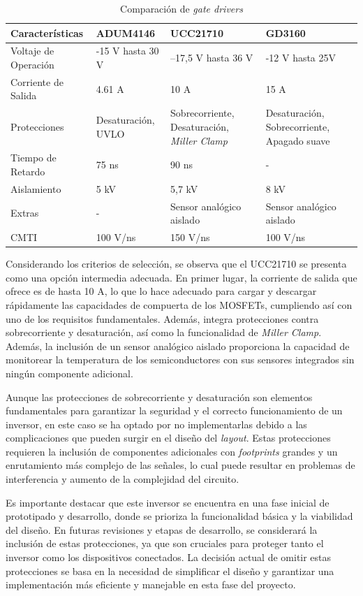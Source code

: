 \begin{table}[H]
	\centering
	\begin{tabular}{|l|p{3.5cm}|p{3.5cm}|p{3.5cm}|}
		\hline
		\textbf{Características} & \textbf{ADUM4146} & \textbf{UCC21710} & \textbf{GD3160} \\
		\hline
		Voltaje de Operación & -15 V hasta 30 V & –17,5 V hasta 36 V & -12 V hasta 25V \\
		\hline
		Corriente de Salida & 4.61 A & 10 A & 15 A \\
		\hline
		Protecciones & Desaturación, UVLO & Sobrecorriente, Desaturación, \textit{Miller Clamp} & Desaturación, Sobrecorriente, Apagado suave \\
		\hline
		Tiempo de Retardo & 75 ns & 90 ns & - \\
		\hline
		Aislamiento & 5 kV & 5,7 kV & 8 kV \\
		\hline
		Extras & - & Sensor analógico aislado & Sensor analógico aislado \\
		\hline
		CMTI & 100 V/ns & 150 V/ns & 100 V/ns \\
		\hline
	\end{tabular}
	\caption{Comparación de \textit{gate drivers}}
\end{table}

Considerando los criterios de selección, se observa que el UCC21710 se presenta como una opción intermedia adecuada. En primer lugar, la corriente de salida que ofrece es de hasta 10 A, lo que lo hace adecuado para cargar y descargar rápidamente las capacidades de compuerta de los MOSFETs, cumpliendo así con uno de los requisitos fundamentales. Además, integra protecciones contra sobrecorriente y desaturación, así como la funcionalidad de \textit{Miller Clamp}. Además, la inclusión de un sensor analógico aislado proporciona la capacidad de monitorear la temperatura de los semiconductores con sus sensores integrados sin ningún componente adicional.

Aunque las protecciones de sobrecorriente y desaturación son elementos fundamentales para garantizar la seguridad y el correcto funcionamiento de un inversor, en este caso se ha optado por no implementarlas debido a las complicaciones que pueden surgir en el diseño del \textit{layout}. Estas protecciones requieren la inclusión de componentes adicionales con \textit{footprints} grandes y un enrutamiento más complejo de las señales, lo cual puede resultar en problemas de interferencia y aumento de la complejidad del circuito.

Es importante destacar que este inversor se encuentra en una fase inicial de prototipado y desarrollo, donde se prioriza la funcionalidad básica y la viabilidad del diseño. En futuras revisiones y etapas de desarrollo, se considerará la inclusión de estas protecciones, ya que son cruciales para proteger tanto el inversor como los dispositivos conectados. La decisión actual de omitir estas protecciones se basa en la necesidad de simplificar el diseño y garantizar una implementación más eficiente y manejable en esta fase del proyecto.


